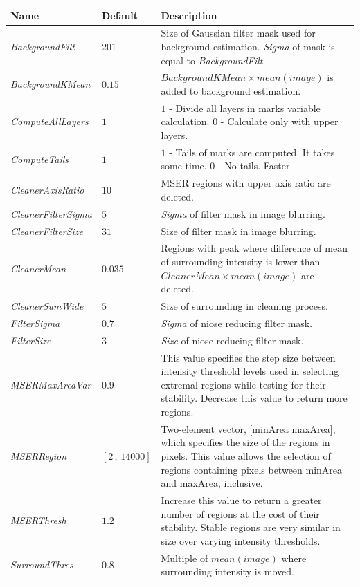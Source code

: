 \begin{center}


\begin{tabular}{l|l|p{8cm}}
    \textbf{Name} 		& \textbf{Default} & \textbf{Description} \\ \hline \hline 
    \textit{BackgroundFilt}	    	& $201$ 	& Size of Gaussian filter mask used for background estimation. \textit{Sigma} of mask is equal to \textit{BackgroundFilt} \\ \hline
    \textit{BackgroundKMean}    	& $0.15$	& $BackgroundKMean \times mean(image)$ is added to background estimation. \\ \hline
    \textit{ComputeAllLayers}   	& $1$		& $1$ - Divide all layers in marks variable calculation. $0$ - Calculate only with upper layers. \\ \hline
    \textit{ComputeTails}   		& $ 1 $		& $1$ - Tails of marks are computed. It takes some time. $0$ - No tails. Faster.\\ \hline    
    \textit{CleanerAxisRatio}   	& $ 10 $	& MSER regions with upper axis ratio are deleted. \\ \hline
    \textit{CleanerFilterSigma}  	& $ 5 $		& \textit{Sigma} of filter mask in image blurring. \\ \hline
    \textit{CleanerFilterSize}   	& $ 31 $	& Size of filter mask in image blurring.\\ \hline
	\textit{CleanerMean}    		& $ 0.035 $ & Regions with peak where difference of mean of surrounding
intensity is lower than $CleanerMean \times mean(image)$ are deleted. \\ \hline
    \textit{CleanerSumWide} 		& $ 5 $		& Size of surrounding in cleaning process.  \\ \hline
    \textit{FilterSigma}    		& $ 0.7 $	& \textit{Sigma} of niose reducing filter mask. \\ \hline
    \textit{FilterSize} 			& $ 3 $		& \textit{Size} of niose reducing filter mask.\\ \hline 
    \textit{MSERMaxAreaVar} 		& $ 0.9 $	& This value specifies the step size between intensity threshold levels used in selecting extremal regions while testing for their stability. Decrease this value to return more regions.\\ \hline
    \textit{MSERRegion} 			&$[2\,,\, 14000]$& Two-element vector, [minArea maxArea], which specifies the size of the regions in pixels. This value allows the selection of regions containing pixels between minArea and maxArea, inclusive.\\ \hline
    \textit{MSERThresh} 			& $ 1.2 $	& Increase this value to return a greater number of regions at the cost of their stability. Stable regions are very similar in size over varying intensity thresholds.\\ \hline
    \textit{SurroundThres}   		& $ 0.8 $	& Multiple of $mean(image)$ where surrounding intensity is moved.   \\ 
\end{tabular}

\end{center}


